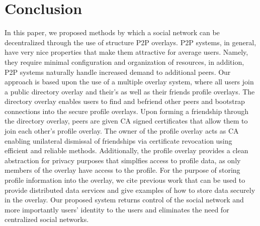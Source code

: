 \documentclass[conference]{IEEEtran}
\begin{document}
\section{Conclusion}
\label{conclusion}

In this paper, we proposed methods by which a social network can be
decentralized through the use of structure P2P overlays.  P2P systems, in
general, have very nice properties that make them attractive for average users.
Namely, they require minimal configuration and organization of resources, in
addition, P2P systems naturally handle increased demand to additional peers.
Our approach is based upon the use of a multiple overlay system, where all
users join a public directory overlay and their's as well as their friends
profile overlays.  The directory overlay enables users to find and befriend
other peers and bootstrap connections into the secure profile overlays.  Upon
forming a friendship through the directory overlay, peers are given CA signed
certificates that allow them to join each other's profile overlay.  The owner
of the profile overlay acts as CA enabling unilateral dismissal of friendships
via certificate revocation using efficient and reliable methods.  Additionally,
the profile overlay provides a clean abstraction for privacy purposes that
simplfies access to profile data, as only members of the overlay have access to
the profile.  For the purpose of storing profile information into the overlay,
we cite previous work that can be used to provide distributed data services and
give examples of how to store data securely in the overlay.  Our proposed
system returns control of the social network and more importantly users'
identity to the users and eliminates the need for centralized social networks.

\small{


}
\end{document}
